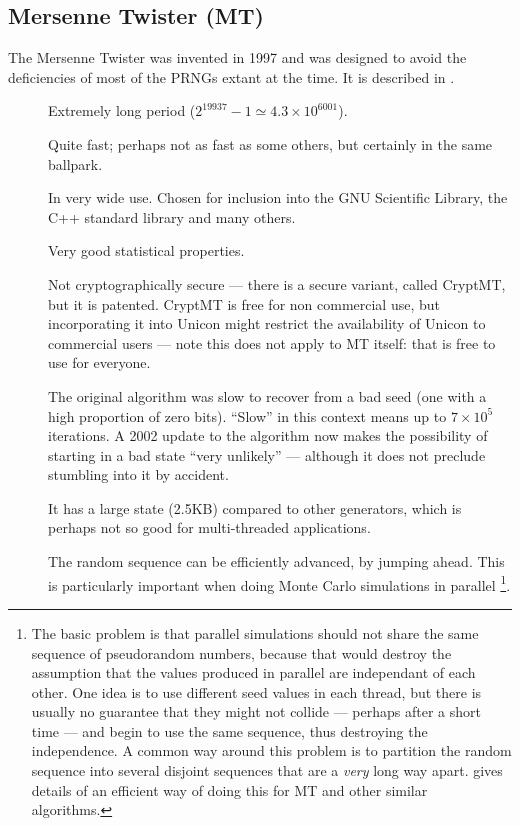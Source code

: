\documentclass[letterpaper,12pt]{article}
\begin{document}
\subsection{Mersenne Twister (MT)}
The Mersenne Twister was invented in 1997 and was designed to avoid the
deficiencies of most of the PRNGs extant at the time. It is described in
\cite{Matsumoto:MersenneTwister}.
\begin{description}
\item[\GoodThing]
  Extremely long period ($2^{19937} - 1 \simeq 4.3 \times 10^{6001}$).
\item[\GoodThing]
  Quite fast; perhaps not as fast as some others, but certainly in the same ballpark.
\item[\GoodThing]
  In very wide use. Chosen for inclusion into the GNU Scientific Library,
  the C++ standard library and many others.
\item[\GoodThing]
  Very good statistical properties.
\item[\PossiblyBadThing]
  Not cryptographically secure --- there is a secure variant, called
  CryptMT, but it is patented. CryptMT is free for non commercial use,
  but incorporating it into Unicon might restrict the availability of
  Unicon to commercial users --- note this does not apply to MT itself: that
  is free to use for everyone.
\item[\PossiblyBadThing]
  The original algorithm was slow to recover from a bad seed (one with a
  high proportion of zero bits). ``Slow'' in this context means up to $7
  \times 10^5$ iterations. A 2002 update to the algorithm now makes the
  possibility of starting in a bad state ``very unlikely'' --- although it
  does not preclude stumbling into it by accident.
\item[\PossiblyBadThing]
  It has a large state (2.5KB) compared to other generators, which is
  perhaps not so good for multi-threaded applications.

\item[\GoodThing]
  The random sequence can be efficiently advanced, by jumping ahead. This is
  particularly important when doing Monte Carlo simulations in parallel%
  \footnote{
    The basic problem is that parallel simulations should not share the
    same sequence of pseudorandom numbers, because that would destroy the
    assumption that the values produced in parallel are independant of each
    other. One idea is to use different seed values in each thread, but
    there is usually no guarantee that they might not collide --- perhaps
    after a short time --- and begin to use the same sequence, thus
    destroying the independence. A common way around this problem is to
    partition the random sequence into several disjoint sequences that are
    a {\em very} long way apart. \cite{HiroshiEtAl:EfficientJumping} gives
    details of an efficient way of doing this for MT and other similar
    algorithms.
  }.


\end{description}
\end{document}
